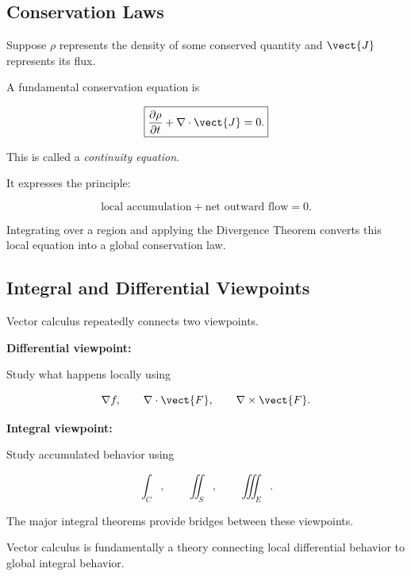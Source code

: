 \subsection{Conservation Laws}
\label{subsec:conservation-laws-vector-calculus}

Suppose \(\rho\) represents the density of some conserved quantity and
\(\vect{J}\) represents its flux.

A fundamental conservation equation is

\[ \boxed{\frac{\partial\rho}{\partial t}
+\nabla\cdot\vect{J}=0.} \]

This is called a \emph{continuity equation}.

It expresses the principle:

\[ \text{local accumulation}
+
\text{net outward flow}
=0. \]

Integrating over a region and applying the Divergence Theorem converts this
local equation into a global conservation law.

\subsection{Integral and Differential Viewpoints}
\label{subsec:integral-differential-viewpoints}

Vector calculus repeatedly connects two viewpoints.

\textbf{Differential viewpoint:}

Study what happens locally using

\[ \nabla f,\qquad
\nabla\cdot\vect{F},\qquad
\nabla\times\vect{F}. \]

\textbf{Integral viewpoint:}

Study accumulated behavior using

\[ \int_C,\qquad \iint_S,\qquad \iiint_E. \]

The major integral theorems provide bridges between these viewpoints.

\begin{conceptbox}
Vector calculus is fundamentally a theory connecting local differential
behavior to global integral behavior.
\end{conceptbox}


